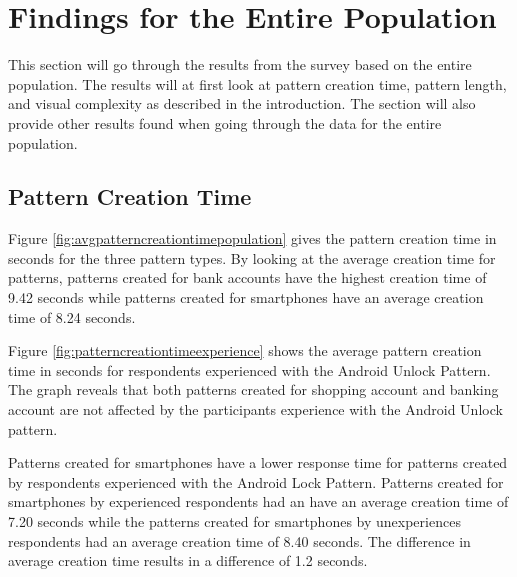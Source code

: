 \section{Findings for the Entire Population}\label{sec:findingsEntirePopulation}
  
  This section will go through the results from the survey based on the entire population. The results will at first look at pattern creation time, pattern length, and visual complexity as described in the introduction. The section will also provide other results found when going through the data for the entire population. 

	\subsection{Pattern Creation Time}
    Figure \ref{fig:avgpatterncreationtimepopulation} gives the pattern creation time in seconds for the three pattern types. By looking at the average creation time for patterns, patterns created for bank accounts have the highest creation time of 9.42 seconds while patterns created for smartphones have an average creation time of 8.24 seconds. 

    Figure \ref{fig:patterncreationtimeexperience} shows the average pattern creation time in seconds for respondents experienced with the Android Unlock Pattern. The graph reveals that both patterns created for shopping account and banking account are not affected by the participants experience with the Android Unlock pattern.

    Patterns created for smartphones have a lower response time for patterns created by respondents experienced with the Android Lock Pattern. Patterns created for smartphones by experienced respondents had an have an average creation time of 7.20 seconds while the patterns created for smartphones by unexperiences respondents had an average creation time of 8.40 seconds. The difference in average creation time results in a difference of 1.2 seconds. 

